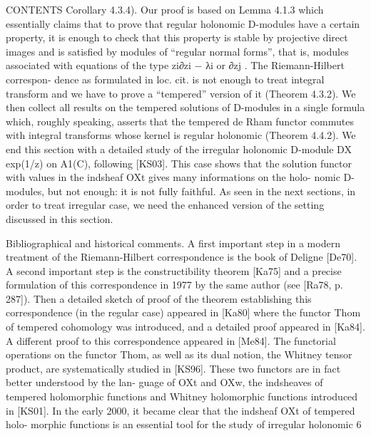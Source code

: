 \documentclass[12pt,a4paper]{jsarticle}
\theoremstyle{plain}
\theoremstyle{definition}
\theoremstyle{remark}
\numberwithin{equation}{section}
\begin{document}
CONTENTS
Corollary 4.3.4). Our proof is based on Lemma 4.1.3 which essentially claims that to prove that regular holonomic D-modules have a certain property, it is enough to check that this property is stable by projective direct images and is satisfied by modules of “regular normal forms”, that is, modules associated with equations of the type zi∂zi − λi or ∂zj . The Riemann-Hilbert correspon- dence as formulated in loc. cit. is not enough to treat integral transform and we have to prove a “tempered” version of it (Theorem 4.3.2). We then collect all results on the tempered solutions of D-modules in a single formula which, roughly speaking, asserts that the tempered de Rham functor commutes with integral transforms whose kernel is regular holonomic (Theorem 4.4.2). We end this section with a detailed study of the irregular holonomic D-module DX exp(1/z) on A1(C), following [KS03]. This case shows that the solution functor with values in the indsheaf OXt gives many informations on the holo- nomic D-modules, but not enough: it is not fully faithful. As seen in the next sections, in order to treat irregular case, we need the enhanced version of the setting discussed in this section.




Bibliographical and historical comments. 
A first important step in a modern treatment 
of the Riemann-Hilbert correspondence is the book of 
Deligne [De70]. 
A second important step is the constructibility theorem [Ka75] 
and a precise formulation of this correspondence in 1977 
by the same author (see [Ra78, p. 287]). 
Then a detailed sketch of proof of the theorem 
establishing this correspondence (in the regular case) 
appeared in [Ka80] 
where the functor Thom of tempered cohomology 
was introduced, and a detailed proof appeared in [Ka84]. 
A different proof to this correspondence
appeared in [Me84]. 
The functorial operations on the functor Thom, 
as well as its dual notion, 
the Whitney tensor product, are systematically 
studied in [KS96]. 
These two functors are in fact better understood by the lan- guage of OXt and OXw, the indsheaves of tempered holomorphic functions and Whitney holomorphic functions introduced in [KS01].
In the early 2000, it became clear that the indsheaf OXt of tempered holo- morphic functions is an essential tool for the study of irregular holonomic
6
 
\end{document}
